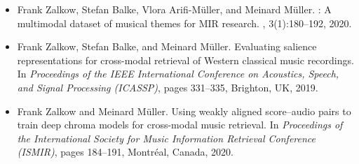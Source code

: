 \documentclass[11pt,a4paper]{article}
\theoremstyle{plain} \newtheorem{define}{Definition}[section]
\begin{document}
{{\begin{itemize}
\item
[\cite{ZalkowBAM20_MTD_TISMIR}]
Frank Zalkow, Stefan Balke, Vlora Arifi-M{\"{u}}ller, and Meinard M{\"{u}}ller.
: {A} multimodal dataset of musical themes for {MIR} research.
, 3(1):180--192, 2020.

\item
[\cite{ZalkowBM19_SalienceRetrieval_ICASSP}]
Frank Zalkow, Stefan Balke, and Meinard M{\"u}ller.
\newblock Evaluating salience representations for cross-modal retrieval of
  {W}estern classical music recordings.
\newblock In {\em Proceedings of the {IEEE} International Conference on
  Acoustics, Speech, and Signal Processing ({ICASSP})}, pages 331--335,
  Brighton, {UK}, 2019.


\item
[\cite{ZalkowM20_WeaklyAlignedTrain_ISMIR}]
Frank Zalkow and Meinard M{\"u}ller.
\newblock Using weakly aligned score--audio pairs to train deep chroma models
  for cross-modal music retrieval.
\newblock In {\em Proceedings of the International Society for Music
  Information Retrieval Conference ({ISMIR})}, pages 184--191, Montr{\'{e}}al,
  Canada, 2020.
\end{itemize}
}

}
\end{document}
